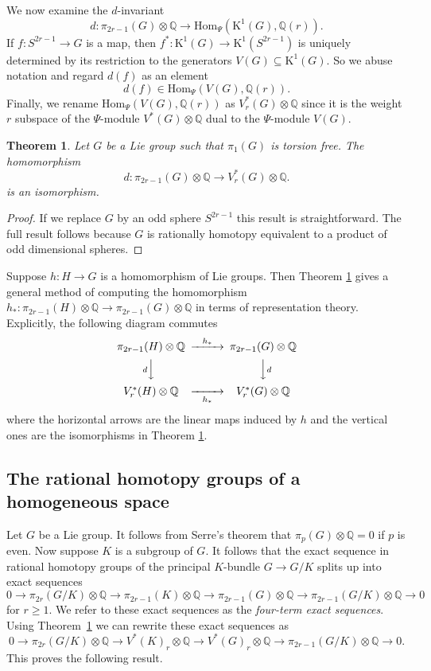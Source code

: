 \documentclass[twoside,a4paper,reqno,11pt]{amsart}
\newtheorem{theorem}[lemma]{Theorem}
\newcommand{\K}{\mathrm{K}}
\newcommand{\Q}{\mathbb{Q}}
\renewcommand{\o}{\otimes}
\newcommand{\Hom}{\mathrm{Hom}}
\begin{document}
We now examine the $d$-invariant
\[
d : \pi_{2r-1}(G) \otimes \Q \to \Hom_{\Psi}(\K^1(G), \Q(r)).
\]
If $f:S^{2r-1} \to G$ is a map, then $f^* : \K^1(G) \to \K^1(S^{2r-1})$ is uniquely determined by its restriction to the generators $V(G) \subseteq \K^1(G)$.  So we abuse notation and regard $d(f)$ as an element
$$
d(f) \in \Hom_{\Psi}(V(G), \Q(r)). 
$$
Finally, we rename $\Hom_{\Psi}(V(G), \Q(r))$ as $V^*_r(G)\o\Q$ since it is the weight $r$ subspace of the $\Psi$-module $V^*(G)\o \Q$ dual to the $\Psi$-module $V(G)$.  

\begin{theorem} \label{thm:dmapisiso}
Let $G$ be a Lie group such that $\pi_1(G)$ is torsion free. The homomorphism
$$
d : \pi_{2r-1}(G) \otimes \Q \to V^*_r(G)\otimes\Q.
$$
is an isomorphism.
\end{theorem}
\begin{proof}
If we replace $G$ by an odd sphere $S^{2r-1}$ this result is straightforward.  The full result follows because $G$ is rationally homotopy equivalent to a product of odd dimensional spheres.
\end{proof}
Suppose $h : H \to G$ is a homomorphism of Lie groups. Then Theorem \ref{thm:dmapisiso} gives a general method of computing the homomorphism $h_* : \pi_{2r-1}(H) \otimes \Q \to \pi_{2r-1}(G) \otimes \Q$ in terms of representation theory.  Explicitly, the following diagram commutes
$$
\begin{CD}
\pi_{2r-1}(H) \otimes \Q @>{h_*}>> \pi_{2r-1}(G) \otimes \Q \\
@V{d}VV @VV{d}V \\
V^*_r(H)\otimes\Q @>>{h_*}> V^*_r(G) \otimes \Q
\end{CD}
$$
where the horizontal arrows are the linear maps induced by $h$ and the vertical ones are the isomorphisms in Theorem \ref{thm:dmapisiso}.

\subsection{The rational homotopy groups of a homogeneous space}
Let $G$ be a Lie group.  It follows from Serre's theorem that $\pi_p(G)\o\Q = 0$ if $p$ is even.  Now suppose $K$ is a subgroup of $G$. It follows that the exact sequence in rational homotopy groups of the principal $K$-bundle $G \to G/K$ splits up into exact sequences
$$
0 \to \pi_{2r}(G/K)\o\Q\to \pi_{2r-1}(K)\o\Q \to \pi_{2r-1}(G)\o\Q \to \pi_{2r-1}(G/K)\o\Q \to 0
$$
for $r \geq 1$.  We refer to these exact sequences as the {\em four-term exact sequences}.  Using Theorem~\ref{thm:dmapisiso} we can rewrite these exact sequences as
$$
0 \to \pi_{2r}(G/K)\o \Q \to V^*(K)_r\o\Q \to V^*(G)_r \o \Q\to \pi_{2r-1}(G/K)\o\Q \to 0.
$$
This proves the following result.
\end{document}
